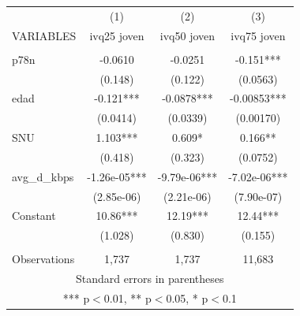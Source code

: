 \documentclass[]{article}
\begin{document}
\begin{tabular}{lccc} \hline
 & (1) & (2) & (3) \\
VARIABLES & ivq25 joven & ivq50 joven & ivq75 joven \\ \hline
 &  &  &  \\
p78n & -0.0610 & -0.0251 & -0.151*** \\
 & (0.148) & (0.122) & (0.0563) \\
edad & -0.121*** & -0.0878*** & -0.00853*** \\
 & (0.0414) & (0.0339) & (0.00170) \\
SNU & 1.103*** & 0.609* & 0.166** \\
 & (0.418) & (0.323) & (0.0752) \\
avg\_d\_kbps & -1.26e-05*** & -9.79e-06*** & -7.02e-06*** \\
 & (2.85e-06) & (2.21e-06) & (7.90e-07) \\
Constant & 10.86*** & 12.19*** & 12.44*** \\
 & (1.028) & (0.830) & (0.155) \\
 &  &  &  \\
 Observations & 1,737 & 1,737 & 11,683 \\ \hline
\multicolumn{4}{c}{ Standard errors in parentheses} \\
\multicolumn{4}{c}{ *** p$<$0.01, ** p$<$0.05, * p$<$0.1} \\
\end{tabular}
\end{document}
